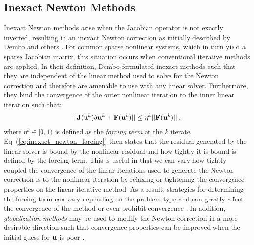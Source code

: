 \subsection{Inexact Newton Methods}
\label{subsec:inexact_newton_methods}
Inexact Newton methods arise when the Jacobian operator is not exactly
inverted, resulting in an inexact Newton correction as initially
described by Dembo and others \cite{dembo_inexact_1982}. For common
sparse nonlinear systems, which in turn yield a sparse Jacobian
matrix, this situation occurs when conventional iterative methods are
applied. In their definition, Dembo formulated inexact methods such
that they are independent of the linear method used to solve for the
Newton correction and therefore are amenable to use with any linear
solver. Furthermore, they bind the convergence of the outer nonlinear
iteration to the inner linear iteration such that:
\begin{equation}
  ||\mathbf{J}(\mathbf{u}^k)\delta \mathbf{u}^k + \mathbf{F}(\mathbf{u}^k)|| \leq \eta^k
  ||\mathbf{F}(\mathbf{u}^k)||\:,
  \label{eq:inexact_newton_forcing}
\end{equation}
where $\eta^k \in [0,1)$ is defined as the \textit{forcing term} at
  the $k$ iterate. Eq~(\ref{eq:inexact_newton_forcing}) then states
  that the residual generated by the linear solver is bound by the
  nonlinear residual and how tightly it is bound is defined by the
  forcing term. This is useful in that we can vary how tightly coupled
  the convergence of the linear iterations used to generate the Newton
  correction is to the nonlinear iteration by relaxing or tightening
  the convergence properties on the linear iterative method. As a
  result, strategies for determining the forcing term can vary
  depending on the problem type and can greatly affect the convergence
  of the method or even prohibit convergence
  \cite{eisenstat_choosing_1996}. In addition, \textit{globalization
    methods} may be used to modify the Newton correction in a more
  desirable direction such that convergence properties can be
  improved when the initial guess for $\mathbf{u}$ is poor
  \cite{pawlowski_globalization_2006}.


